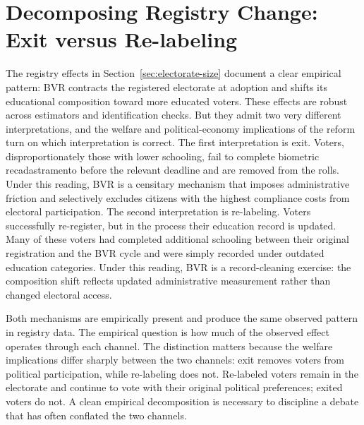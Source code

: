 \section{Decomposing Registry Change: Exit versus Re-labeling}
\label{sec:decomposition}

The registry effects in Section~\ref{sec:electorate-size} document a clear empirical pattern: BVR contracts the registered electorate at adoption and shifts its educational composition toward more educated voters. These effects are robust across estimators and identification checks. But they admit two very different interpretations, and the welfare and political-economy implications of the reform turn on which interpretation is correct. The first interpretation is exit. Voters, disproportionately those with lower schooling, fail to complete biometric recadastramento before the relevant deadline and are removed from the rolls. Under this reading, BVR is a censitary mechanism that imposes administrative friction and selectively excludes citizens with the highest compliance costs from electoral participation. The second interpretation is re-labeling. Voters successfully re-register, but in the process their education record is updated. Many of these voters had completed additional schooling between their original registration and the BVR cycle and were simply recorded under outdated education categories. Under this reading, BVR is a record-cleaning exercise: the composition shift reflects updated administrative measurement rather than changed electoral access.

Both mechanisms are empirically present and produce the same observed pattern in registry data. The empirical question is how much of the observed effect operates through each channel. The distinction matters because the welfare implications differ sharply between the two channels: exit removes voters from political participation, while re-labeling does not. Re-labeled voters remain in the electorate and continue to vote with their original political preferences; exited voters do not. A clean empirical decomposition is necessary to discipline a debate that has often conflated the two channels.

